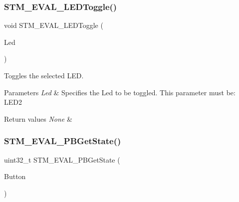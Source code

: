 \subsubsection{\texorpdfstring{STM\_EVAL\_LEDToggle()}{STM\_EVAL\_LEDToggle()}}
{\footnotesize\ttfamily void S\+T\+M\+\_\+\+E\+V\+A\+L\+\_\+\+L\+E\+D\+Toggle (\begin{DoxyParamCaption}\item[{\mbox{\hyperlink{group___s_t_m32_f1_x_x___n_u_c_l_e_o___l_o_w___l_e_v_e_l___exported___types_gaa059704b7ca945eb9c1e7f2c3d03fecd}{Led\+\_\+\+Type\+Def}}}]{Led }\end{DoxyParamCaption})}



Toggles the selected L\+ED. 


\begin{DoxyParams}{Parameters}
{\em Led} & Specifies the Led to be toggled. This parameter must be\+: L\+E\+D2 \\
\hline
\end{DoxyParams}

\begin{DoxyRetVals}{Return values}
{\em None} & \\
\hline
\end{DoxyRetVals}
\mbox{\label{group___s_t_m32_f1_x_x___n_u_c_l_e_o___l_o_w___l_e_v_e_l___exported___functions_ga812ee2a84aaed235587ac81eb9269442}} 
\subsubsection{\texorpdfstring{STM\_EVAL\_PBGetState()}{STM\_EVAL\_PBGetState()}}
{\footnotesize\ttfamily uint32\+\_\+t S\+T\+M\+\_\+\+E\+V\+A\+L\+\_\+\+P\+B\+Get\+State (\begin{DoxyParamCaption}\item[{\mbox{\hyperlink{group___s_t_m32_f1_x_x___n_u_c_l_e_o___l_o_w___l_e_v_e_l___exported___types_ga643816dfbad5c734fc25a29ce8d35bb1}{Button\+\_\+\+Type\+Def}}}]{Button }\end{DoxyParamCaption})}



